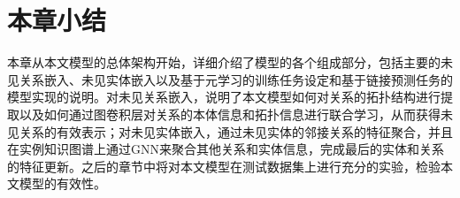 \section{本章小结}
本章从本文模型的总体架构开始，详细介绍了模型的各个组成部分，包括主要的未见关系嵌入、未见实体嵌入以及基于元学习的训练任务设定和基于链接预测任务的模型实现的说明。对未见关系嵌入，说明了本文模型如何对关系的拓扑结构进行提取以及如何通过图卷积层对关系的本体信息和拓扑信息进行联合学习，从而获得未见关系的有效表示；对未见实体嵌入，通过未见实体的邻接关系的特征聚合，并且在实例知识图谱上通过GNN来聚合其他关系和实体信息，完成最后的实体和关系的特征更新。之后的章节中将对本文模型在测试数据集上进行充分的实验，检验本文模型的有效性。
